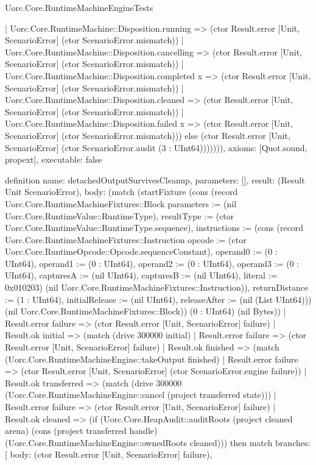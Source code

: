 \begin{lexlean}{Uorc.Core.RuntimeMachineEngineTests}
\begin{semanticmodule}
{        | Uorc.Core.RuntimeMachine::Disposition.running => (ctor Result.error [Unit, ScenarioError] (ctor ScenarioError.mismatch))
        | Uorc.Core.RuntimeMachine::Disposition.cancelling => (ctor Result.error [Unit, ScenarioError] (ctor ScenarioError.mismatch))
        | Uorc.Core.RuntimeMachine::Disposition.completed x => (ctor Result.error [Unit, ScenarioError] (ctor ScenarioError.mismatch))
        | Uorc.Core.RuntimeMachine::Disposition.cleaned => (ctor Result.error [Unit, ScenarioError] (ctor ScenarioError.mismatch))
        | Uorc.Core.RuntimeMachine::Disposition.failed x => (ctor Result.error [Unit, ScenarioError] (ctor ScenarioError.mismatch))) else (ctor Result.error [Unit, ScenarioError] (ctor ScenarioError.audit (3 : UInt64))))))),
  axioms: [Quot.sound, propext],
  executable: false
}

definition{
  name: detachedOutputSurvivesCleanup,
  parameters: [],
  result: (Result Unit ScenarioError),
  body: (match (startFixture (cons (record Uorc.Core.RuntimeMachineFixtures::Block {parameters := (nil Uorc.Core.RuntimeValue::RuntimeType), resultType := (ctor Uorc.Core.RuntimeValue::RuntimeType.sequence), instructions := (cons (record Uorc.Core.RuntimeMachineFixtures::Instruction {opcode := (ctor Uorc.Core.RuntimeOpcode::Opcode.sequenceConstant), operand0 := (0 : UInt64), operand1 := (0 : UInt64), operand2 := (0 : UInt64), operand3 := (0 : UInt64), capturesA := (nil UInt64), capturesB := (nil UInt64), literal := 0x010203}) (nil Uorc.Core.RuntimeMachineFixtures::Instruction)), returnDistance := (1 : UInt64), initialRelease := (nil UInt64), releaseAfter := (nil (List UInt64))}) (nil Uorc.Core.RuntimeMachineFixtures::Block)) (0 : UInt64) (nil Bytes))
    | Result.error failure => (ctor Result.error [Unit, ScenarioError] failure)
    | Result.ok initial => (match (drive 300000 initial)
      | Result.error failure => (ctor Result.error [Unit, ScenarioError] failure)
      | Result.ok finished => (match (Uorc.Core.RuntimeMachineEngine::takeOutput finished)
        | Result.error failure => (ctor Result.error [Unit, ScenarioError] (ctor ScenarioError.engine failure))
        | Result.ok transferred => (match (drive 300000 (Uorc.Core.RuntimeMachineEngine::cancel (project transferred state)))
          | Result.error failure => (ctor Result.error [Unit, ScenarioError] failure)
          | Result.ok cleaned => (if (Uorc.Core.HeapAudit::auditRoots (project cleaned arena) (cons (project transferred handle) (Uorc.Core.RuntimeMachineEngine::ownedRoots cleaned))) then match{
            branches: [
              {
                body: (ctor Result.error [Unit, ScenarioError] failure),
}}}
\end{semanticmodule}
\end{lexlean}
